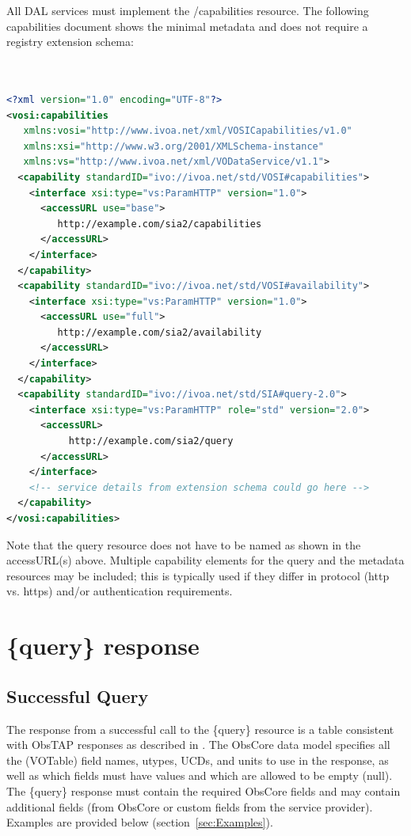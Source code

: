 \documentclass[11pt,a4paper]{ivoa}
\begin{document}
All DAL services must implement the /capabilities resource. The following capabilities document shows the minimal metadata and does not require a registry extension schema:

\begin{lstlisting}[language=XML]


<?xml version="1.0" encoding="UTF-8"?>
<vosi:capabilities 
   xmlns:vosi="http://www.ivoa.net/xml/VOSICapabilities/v1.0" 
   xmlns:xsi="http://www.w3.org/2001/XMLSchema-instance" 
   xmlns:vs="http://www.ivoa.net/xml/VODataService/v1.1">
  <capability standardID="ivo://ivoa.net/std/VOSI#capabilities">
    <interface xsi:type="vs:ParamHTTP" version="1.0">
      <accessURL use="base">
         http://example.com/sia2/capabilities
      </accessURL>
    </interface>
  </capability>
  <capability standardID="ivo://ivoa.net/std/VOSI#availability">
    <interface xsi:type="vs:ParamHTTP" version="1.0">
      <accessURL use="full">
         http://example.com/sia2/availability
      </accessURL>
    </interface>
  </capability>
  <capability standardID="ivo://ivoa.net/std/SIA#query-2.0">
    <interface xsi:type="vs:ParamHTTP" role="std" version="2.0">
      <accessURL>
           http://example.com/sia2/query
      </accessURL>
    </interface>
    <!-- service details from extension schema could go here -->
  </capability>
</vosi:capabilities>
\end{lstlisting}

Note that the {query} resource does not have to be named as shown in the accessURL(s) above. Multiple capability elements for the {query} and the {metadata} resources may be included; this is typically used if they differ in protocol (http vs. https) and/or authentication requirements.

\section{\{query\} response}
\label{sec:queryresponse}

\subsection{Successful Query}
\label{sec:succesful}

The response from a successful call to the \{query\} resource is a table consistent with  ObsTAP responses as described in \cite{std:OBSCORE}. The ObsCore data model specifies all the (VOTable) field names, utypes, UCDs, and units to use in the response, as well as which fields must have values and which are allowed to be empty (null). The \{query\} response must contain the required ObsCore fields and may contain additional fields (from ObsCore or custom fields from the service provider). Examples are provided below (section~\ref{sec:Examples}).
\end{document}
